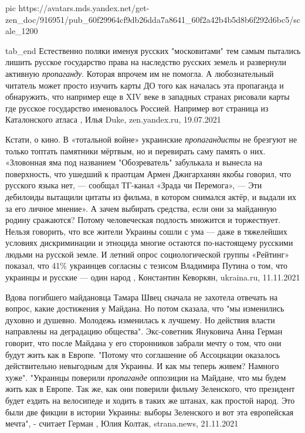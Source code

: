      pic https://avatars.mds.yandex.net/get-zen_doc/916951/pub_60f29964cf9db26dda7a8641_60f2a42b4b5d8b6f292d6bc5/scale_1200

  tab_end
\fi
Естественно поляки именуя русских "московитами" тем самым пытались лишить
русское государство права на наследство русских земель и развернули активную
\emph{пропаганду}. Которая впрочем им не помогла.  А любознательный читатель
может просто изучить карты ДО того как началась эта пропаганда и обнаружить,
что например еще в XIV веке в западных странах рисовали карты где русское
государство именовалось Россией. Например вот страница из Каталонского атласа
, Илья Duke, zen.yandex.ru, 19.07.2021

Кстати, о кино. В «тотальной войне» украинские \emph{пропагандисты} не брезгуют
не только топтать памятники мёртвым, но и перевирать саму память о них.
«Зловонная яма под названием "Обозреватель" забулькала и вынесла на
поверхность, что ушедший к праотцам Армен Джигарханян якобы говорил, что
русского языка нет, — сообщал ТГ-канал «Зрада чи Перемога», — Эти дебилоиды
вытащили цитаты из фильма, в котором снимался актёр, и выдали их за его личное
мнение». А зачем выбирать средства, если они за майданную родину сражаются?
Потому человеческая подлость множится и торжествует.  Нельзя говорить, что все
жители Украины сошли с ума — даже в тяжелейших условиях дискриминации и
этноцида многие остаются по-настоящему русскими людьми на русской земле. И
летний опрос социологической группы «Рейтинг» показал, что 41\% украинцев
согласны с тезисом Владимира Путина о том, что украинцы и русские — один народ
, 
Константин Кеворкян, ukraina.ru, 11.11.2021

Вдова погибшего майдановца Тамара Швец сначала не захотела отвечать на вопрос,
какие достижения у Майдана. Но потом сказала, что "мы изменились духовно и
душевно. Молодежь изменилась к лучшему. Но действия власти направлены на
деградацию общества".  Экс-советник Януковича Анна Герман говорит, что после
Майдана у его сторонников забрали мечту о том, что они будут жить как в Европе.
"Потому что соглашение об Ассоциации оказалось действительно невыгодным для
Украины. И как мы теперь живем? Намного хуже".  "Украинцы поверили
\emph{пропаганде} оппозиции на Майдане, что мы будем жить как в Европе. Так же,
как они поверили фильму Зеленского, что президент будет ездить на велосипеде и
ходить в таких же штанах, как простой народ. Это были две фикции в истории
Украины: выборы Зеленского и вот эта европейская мечта", - считает Герман
, 
Юлия Колтак, strana.news, 21.11.2021

